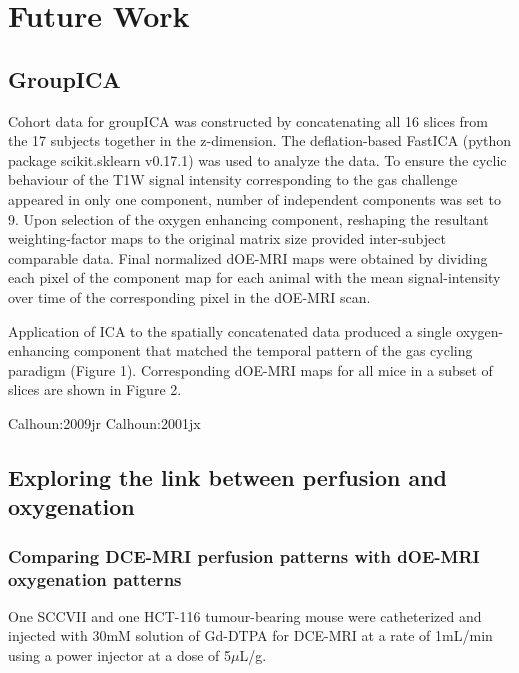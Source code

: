 
\chapter{Future Work}
\label{ch:futurework}

\section{GroupICA}

Cohort data for groupICA was constructed by concatenating all 16 slices from the 17 subjects together in the z-dimension. The deflation-based FastICA (python package scikit.sklearn v0.17.1) was used to analyze the data. To ensure the cyclic behaviour of the T1W signal intensity corresponding to the gas challenge appeared in only one component, number of independent components was set to 9. Upon selection of the oxygen enhancing component, reshaping the resultant weighting-factor maps to the original matrix size provided inter-subject comparable data. Final normalized dOE-MRI maps were obtained by dividing each pixel of the component map for each animal with the mean signal-intensity over time of the corresponding pixel in the dOE-MRI scan.

Application of ICA to the spatially concatenated data produced a single oxygen-enhancing component that matched the temporal pattern of the gas cycling paradigm (Figure 1). Corresponding dOE-MRI maps for all mice in a subset of slices are shown in Figure 2.

Calhoun:2009jr
Calhoun:2001jx

\section{Exploring the link between perfusion and oxygenation}

\subsection{Comparing DCE-MRI perfusion patterns with \ac{dOE-MRI} oxygenation patterns}

One SCCVII and one HCT-116 tumour-bearing mouse were catheterized and injected with 30mM solution of Gd-DTPA for DCE-MRI at a rate of 1mL/min using a power injector at a dose of 5$\mu$L/g.

